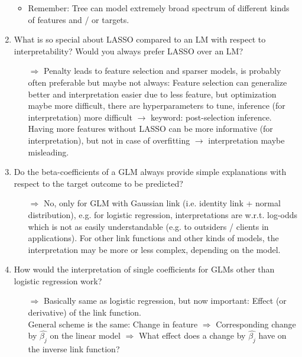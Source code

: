 \begin{enumerate}
\begin{itemize}
            \item Remember: Tree can model extremely broad spectrum of different kinds of features and / or targets.
        \end{itemize}
    	\item What is so special about LASSO compared to an LM with respect to interpretability? Would you always prefer LASSO over an LM?
    	\begin{itemize}
    		\item[$\Rightarrow$] Penalty leads to feature selection and sparser models, is probably often preferable but maybe not always: Feature selection can generalize better and interpretation easier due to less feature, but optimization maybe more difficult, there are hyperparameters to tune, inference (for interpretation) more difficult $\rightarrow$ keyword: post-selection inference.\\
            Having more features without LASSO can be more informative (for interpretation), but not in case of overfitting $\rightarrow$ interpretation maybe misleading.
    	\end{itemize}
        
    	\item Do the beta-coefficients of a GLM always provide simple explanations with respect to the target outcome to be predicted? 
    	\begin{itemize}
    		\item[$\Rightarrow$] No, only for GLM with Gaussian link (i.e. identity link + normal distribution), e.g. for logistic regression, interpretations are w.r.t. log-odds which is not as easily understandable (e.g. to outsiders / clients in applications). For other link functions and other kinds of models, the interpretation may be more or less complex, depending on the model.
    	\end{itemize}
        \item How would the interpretation of single coefficients for GLMs other than logistic regression work?
        \begin{itemize}
            \item[$\Rightarrow$] Basically same as logistic regression, but now important: Effect (or derivative) of the link function.\\
            General scheme is the same: Change in feature $\Rightarrow$ Corresponding change by $\hat{\beta_j}$ on the linear model $\Rightarrow$ What effect does a change by $\hat{\beta_j}$ have on the inverse link function?
        \end{itemize}
        

\end{enumerate}
